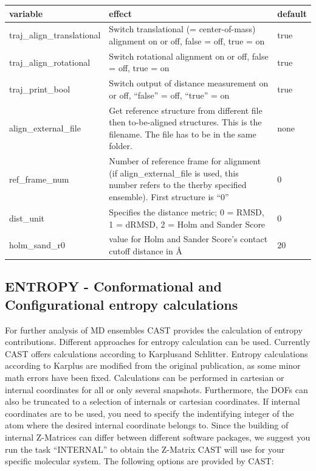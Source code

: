 \documentclass[10pt,a4paper]{article} %
\begin{document}
	\begin{longtable}{|p{3.5cm}|p{5cm}|p{2.5cm}|}
		variable & effect & default\\
		\hline
		traj\_align\_translational & Switch translational (= center-of-mass) alignment on or off, false = off, true = on & true\\
		traj\_align\_rotational & Switch rotational alignment\cite{kabsch1, kabsch2} on or off, false = off, true = on & true\\
		traj\_print\_bool & Switch output of distance measurement on or off, ``false'' = off, ``true'' = on & true\\
		align\_external\_file & Get reference structure from different file then to-be-aligned structures. This is the filename. The file has to be in the same folder. & none\\
		ref\_frame\_num & Number of reference frame for alignment (if align\_external\_file is used, this number refers to the therby specified ensemble). First structure is ``0'' & 0\\
		dist\_unit & Specifies the distance metric; 0 = RMSD, 1 = dRMSD, 2 = Holm and Sander Score & 0\\
		holm\_sand\_r0 & value for Holm and Sander Score's contact cutoff distance in \AA & 20 \\
		
	\end{longtable}
	
	\subsection{ENTROPY - Conformational and Configurational entropy calculations}
	For further analysis of \acl{MD} ensembles \ac{CAST} provides the calculation of entropy contributions. Different approaches for entropy calculation can be used. Currently \ac{CAST} offers calculations according to Karplus\supercite{karplus_entropy}and Schlitter\supercite{schlitter_entropy}. Entropy calculations according to Karplus are modified from the original publication, as some minor math errors have been fixed. Calculations can be performed in cartesian or internal coordinates for all or only several snapshots. Furthermore, the \acp{DOF} can also be truncated to a selection of internals or cartesian coordinates. If internal coordinates are to be used, you need to specify the indentifying integer of the atom where the desired internal coordinate belongs to. Since the building of internal Z-Matrices can differ between different software packages, we suggest you run the task ``INTERNAL'' to obtain the Z-Matrix \ac{CAST} will use for your specific molecular system. The following options are provided by \ac{CAST}: \\~\\
	
\end{document}
